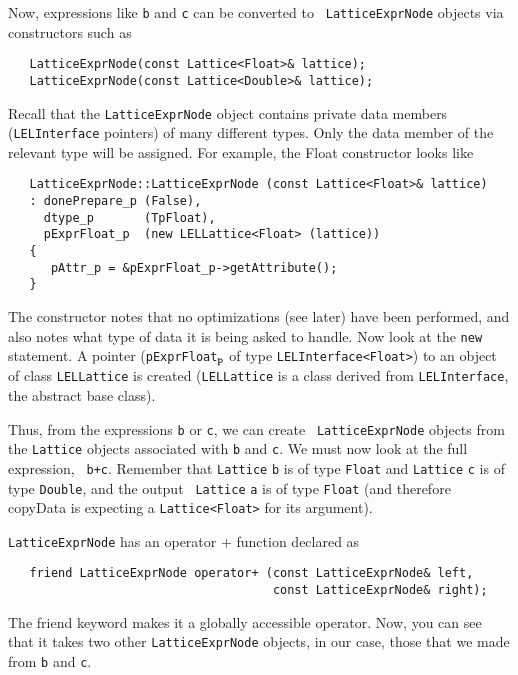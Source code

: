 Now, expressions like {\tt b} and {\tt c} can be converted to {\tt
LatticeExprNode} objects via constructors such as

\begin{verbatim}
   LatticeExprNode(const Lattice<Float>& lattice);
   LatticeExprNode(const Lattice<Double>& lattice);
\end{verbatim}

Recall that the {\tt LatticeExprNode} object contains private data
members ({\tt LELInterface} pointers) of many different types.  Only the
data member of the relevant type will be assigned.  For example, the
Float constructor looks like

\begin{verbatim}
   LatticeExprNode::LatticeExprNode (const Lattice<Float>& lattice)
   : donePrepare_p (False),
     dtype_p       (TpFloat),
     pExprFloat_p  (new LELLattice<Float> (lattice)) 
   {
      pAttr_p = &pExprFloat_p->getAttribute();
   }
\end{verbatim}

The constructor notes that no optimizations (see later) have been
performed, and also notes what type of data it is being asked to handle. 
Now look at the {\tt new} statement.  A pointer ({\tt pExprFloat}$_{\tt p}$
of type {\tt LELInterface<Float>}) to an object of class
{\tt LELLattice} is created ({\tt LELLattice} is a class derived from
{\tt LELInterface}, the abstract base class). 

Thus, from the expressions {\tt b} or {\tt c}, we can create {\tt
LatticeExprNode} objects from the {\tt Lattice} objects associated with
{\tt b} and {\tt c}.  We must now look at the full expression, {\tt
b+c}.  Remember that {\tt Lattice} {\tt b} is of type {\tt Float} and
{\tt Lattice} {\tt c} is of type {\tt Double}, and the output {\tt
Lattice} {\tt a} is of type {\tt Float} (and therefore copyData is
expecting a {\tt Lattice<Float>} for its argument). 

{\tt LatticeExprNode} has an operator $+$ function declared as

\begin{verbatim}
   friend LatticeExprNode operator+ (const LatticeExprNode& left,  
                                     const LatticeExprNode& right);
\end{verbatim}


The friend keyword makes it a globally accessible operator.  Now, you
can see that it takes two other {\tt LatticeExprNode} objects, in our case,
those that we made from {\tt b} and {\tt c}.

